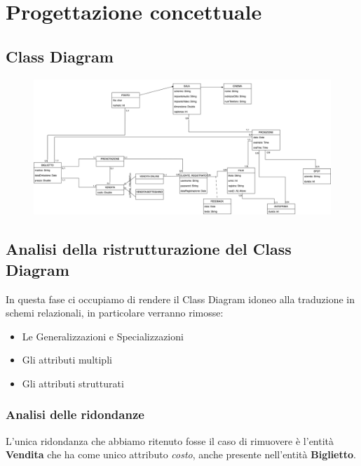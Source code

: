 \chapter{Progettazione concettuale}
    \section{Class Diagram}
    
    \begin{figure}[htbp]
    \begin{center}
        \includegraphics[width=12cm]{Immagini/Schema ER.png}
    \end{center}
    \end{figure}
    \section{Analisi della ristrutturazione del Class Diagram}
        In questa fase ci occupiamo di rendere il Class Diagram idoneo alla traduzione in schemi relazionali, in particolare verranno rimosse:
        \begin{itemize}
            \item Le Generalizzazioni e Specializzazioni
            \item Gli attributi multipli
            \item Gli attributi strutturati
        \end{itemize}
        
        
        
        \subsection{Analisi delle ridondanze}
                \label{analisireq}
            L'unica ridondanza che abbiamo ritenuto fosse il caso di rimuovere è l'entità \textbf{Vendita} che ha come unico attributo \textit{costo}, anche presente nell'entità \textbf{Biglietto}.
            
